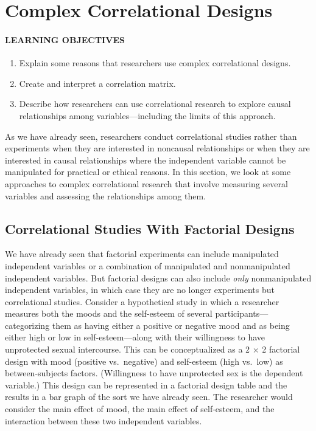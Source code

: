 \documentclass[
]{krantz}
\providecommand{\tightlist}{%
  \setlength{\itemsep}{0pt}\setlength{\parskip}{0pt}}
\begin{document}
\section{Complex Correlational Designs}\label{complex-correlational-designs}

\paragraph*{LEARNING OBJECTIVES}\label{learning-objectives-20}

\begin{enumerate}
\def\labelenumi{\arabic{enumi}.}
\tightlist
\item
  Explain some reasons that researchers use complex correlational designs.
\item
  Create and interpret a correlation matrix.
\item
  Describe how researchers can use correlational research to explore causal relationships among variables---including the limits of this approach.
\end{enumerate}

As we have already seen, researchers conduct correlational studies rather than experiments when they are interested in noncausal relationships or when they are interested in causal relationships where the independent variable cannot be manipulated for practical or ethical reasons. In this section, we look at some approaches to complex correlational research that involve measuring several variables and assessing the relationships among them.

\subsection*{Correlational Studies With Factorial Designs}\label{correlational-studies-with-factorial-designs}


We have already seen that factorial experiments can include manipulated independent variables or a combination of manipulated and nonmanipulated independent variables. But factorial designs can also include \emph{only} nonmanipulated independent variables, in which case they are no longer experiments but correlational studies. Consider a hypothetical study in which a researcher measures both the moods and the self-esteem of several participants---categorizing them as having either a positive or negative mood and as being either high or low in self-esteem---along with their willingness to have unprotected sexual intercourse. This can be conceptualized as a 2 × 2 factorial design with mood (positive vs.~negative) and self-esteem (high vs.~low) as between-subjects factors. (Willingness to have unprotected sex is the dependent variable.) This design can be represented in a factorial design table and the results in a bar graph of the sort we have already seen. The researcher would consider the main effect of mood, the main effect of self-esteem, and the interaction between these two independent variables.
\end{document}
